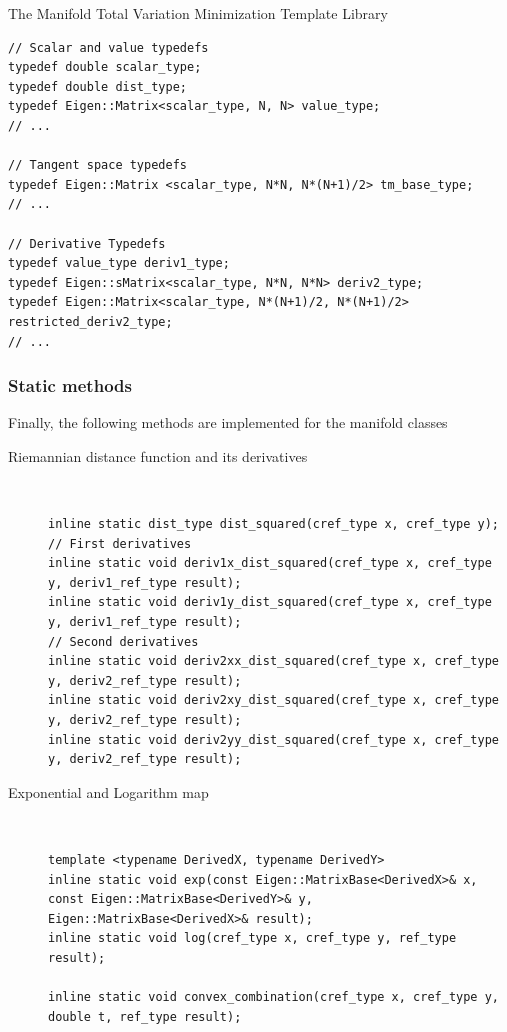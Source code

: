 \begin{chapter}{The Manifold Total Variation Minimization Template Library}
\cppinline
\begin{lstlisting}
// Scalar and value typedefs
typedef double scalar_type;
typedef double dist_type;
typedef Eigen::Matrix<scalar_type, N, N> value_type;
// ...

// Tangent space typedefs
typedef Eigen::Matrix <scalar_type, N*N, N*(N+1)/2> tm_base_type;
// ...

// Derivative Typedefs
typedef value_type deriv1_type;
typedef Eigen::sMatrix<scalar_type, N*N, N*N> deriv2_type;
typedef Eigen::Matrix<scalar_type, N*(N+1)/2, N*(N+1)/2> restricted_deriv2_type;
// ...
\end{lstlisting}

\subsubsection{Static methods} %
\label{ssub:Static methods}
Finally, the following methods are implemented for the manifold classes

\begin{description}
    
    \item[Riemannian distance function and its derivatives] \hfill \\
	\cppinline
	\begin{lstlisting}
inline static dist_type dist_squared(cref_type x, cref_type y);
// First derivatives	    
inline static void deriv1x_dist_squared(cref_type x, cref_type y, deriv1_ref_type result);
inline static void deriv1y_dist_squared(cref_type x, cref_type y, deriv1_ref_type result);
// Second derivatives
inline static void deriv2xx_dist_squared(cref_type x, cref_type y, deriv2_ref_type result);
inline static void deriv2xy_dist_squared(cref_type x, cref_type y, deriv2_ref_type result);
inline static void deriv2yy_dist_squared(cref_type x, cref_type y, deriv2_ref_type result);
	\end{lstlisting}
    
    \item[Exponential and Logarithm map] \hfill \\
	\cppinline
	\begin{lstlisting}
template <typename DerivedX, typename DerivedY>
inline static void exp(const Eigen::MatrixBase<DerivedX>& x, const Eigen::MatrixBase<DerivedY>& y, Eigen::MatrixBase<DerivedX>& result);
inline static void log(cref_type x, cref_type y, ref_type result);

inline static void convex_combination(cref_type x, cref_type y, double t, ref_type result);
	\end{lstlisting}


\end{description}
\end{chapter}

